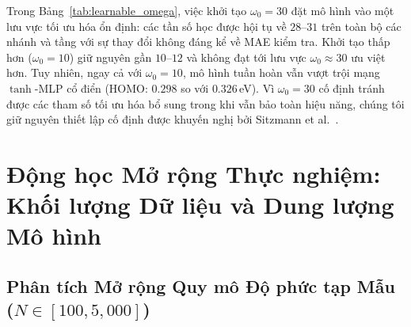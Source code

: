 \documentclass[10pt,twocolumn,letterpaper]{article}
\begin{document}
\begin{table}[ht]
\centering
\small
\caption{\textbf{Thí nghiệm $\omega_0$ Khả học} ($N = 1{,}000$, 3 hạt giống). MAE kiểm tra (eV). Khi khởi tạo ở mức 30, $\omega_0$ học được hội tụ về $28$--$31$ trên toàn bộ các nhánh và tầng, khớp với hiệu năng $\omega_0 = 30$ cố định. Khi khởi tạo ở mức 10, $\omega_0$ duy trì gần $10$--$12$ và không thoát ra được lưu vực $\omega_0 \approx 30$ vượt trội hơn.}
\label{tab:learnable_omega}
\end{table}

Trong Bảng~\ref{tab:learnable_omega}, việc khởi tạo $\omega_0 = 30$ đặt mô hình vào một lưu vực tối ưu hóa ổn định: các tần số học được hội tụ về $28$--$31$ trên toàn bộ các nhánh và tầng với sự thay đổi không đáng kể về MAE kiểm tra. Khởi tạo thấp hơn ($\omega_0 = 10$) giữ nguyên gần $10$--$12$ và không đạt tới lưu vực $\omega_0 \approx 30$ ưu việt hơn. Tuy nhiên, ngay cả với $\omega_0 = 10$, mô hình tuần hoàn vẫn vượt trội mạng $\tanh$-MLP cổ điển (HOMO: $0.298$ so với $0.326$\,eV). Vì $\omega_0 = 30$ cố định tránh được các tham số tối ưu hóa bổ sung trong khi vẫn bảo toàn hiệu năng, chúng tôi giữ nguyên thiết lập cố định được khuyến nghị bởi Sitzmann et al.~\cite{sitzmann2020siren}.

\section{Động học Mở rộng Thực nghiệm: Khối lượng Dữ liệu và Dung lượng Mô hình}
\label{sm:param_scaling}
\label{sm:full_scale}

\subsection{Phân tích Mở rộng Quy mô Độ phức tạp Mẫu ($N \in [100, 5{,}000]$)}
\end{document}
